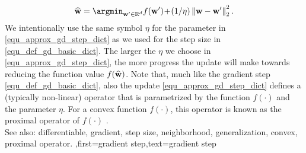 {{\begin{align}
		\label{equ_approx_gd_step_dict}
		\widehat{{\bf w}} = \argmin_{{\bf w}' \in \mathbb{R}^{d}} f({\bf w}')\!+\!(1/\eta)\left\Vert  {{\bf w}-{\bf w}'} \right\Vert_{2}^2. 
		\end{align}
		We intentionally use the same symbol $\eta$ for the parameter in \eqref{equ_approx_gd_step_dict} 
		as we used for the step size in \eqref{equ_def_gd_basic_dict}. The larger the $\eta$ we choose in 
		\eqref{equ_approx_gd_step_dict}, the more progress the update will make towards reducing the 
		function value $f(\widehat{{\bf w}})$. Note that, much like the gradient step \eqref{equ_def_gd_basic_dict}, 
		also the update \eqref{equ_approx_gd_step_dict} defines a (typically non-linear) operator 
		that is parametrized by the function $f(\cdot)$ and the parameter $\eta$. For a convex function 
		$f(\cdot)$, this operator is known as the proximal operator of $f(\cdot)$ \cite{ProximalMethods}. 
					\\ 
		See also: differentiable, gradient, step size, neighborhood, generalization, convex, proximal operator.
		},first={gradient step},text={gradient step}}
	

